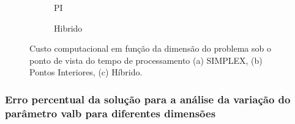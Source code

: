 \begin{figure}[H]
\begin{subfigure}{0.45\textwidth}
        \caption{PI}
        \label{fig:vardim_tempo_PI}
    \end{subfigure}
    \vfill
    \begin{subfigure}{0.45\textwidth}
        \def\filename{datavalb/03_valb_EFobj_Hibrido.txt}  
        \caption{Hibrido}
        \label{fig:vardim_tempo_H}
    \end{subfigure}
    \caption{Custo computacional em função da dimensão do problema sob o ponto de vista do tempo de processamento (a) SIMPLEX, (b) Pontos Interiores, (c) Híbrido.}
    \label{fig:vardim_tempo}
\end{figure}

\subsubsection{Erro percentual da solução para a análise da variação do parâmetro valb para diferentes dimensões}
